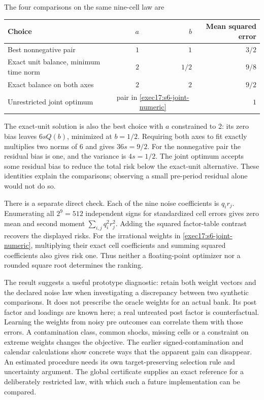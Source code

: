 The four comparisons on the same nine-cell law are
\begin{center}
\begin{tabular}{lrrr}
\toprule
Choice & $a$ & $b$ & Mean squared error\\
\midrule
Best nonnegative pair & $1$ & $1$ & $3/2$\\
Exact unit balance, minimum time norm & $2$ & $1/2$ & $9/8$\\
Exact balance on both axes & $2$ & $2$ & $9/2$\\
Unrestricted joint optimum & \multicolumn{2}{c}{pair in \eqref{exec17:s6-joint-numeric}} & $1$\\
\bottomrule
\end{tabular}
\end{center}
The exact-unit solution is also the best choice with $a$ constrained to 2:
its zero bias leaves $6sQ(b)$, minimized at $b=1/2$. Requiring both axes
to fit exactly multiplies two norms of 6 and gives $36s=9/2$. For the
nonnegative pair the residual bias is one, and the variance is $4s=1/2$.
The joint optimum accepts some residual bias to reduce the total risk below
the exact-unit alternative. These identities explain the comparisons;
observing a small pre-period residual alone would not do so.

There is a separate direct check. Each of the nine noise coefficients is
$q_i r_j$. Enumerating all $2^9=512$ independent signs for standardized
cell errors gives zero mean and second moment
$\sum_{i,j}q_i^2r_j^2$. Adding the squared factor-table contrast recovers
the displayed risks. For the irrational weights in
\eqref{exec17:s6-joint-numeric}, multiplying their exact cell coefficients
and summing squared coefficients also gives risk one. Thus neither a
floating-point optimizer nor a rounded square root determines the ranking.
\citep{exec17_s6_extension}

The result suggests a useful prototype diagnostic: retain both weight
vectors and the declared noise law when investigating a discrepancy between
two synthetic comparisons. It does not prescribe the oracle weights for an
actual bank. Its post factor and loadings are known here; a real untreated
post factor is counterfactual. Learning the weights from noisy pre outcomes
can correlate them with those errors. A contamination class, common shocks,
missing cells or a constraint on extreme weights changes the objective.
The earlier signed-contamination and calendar calculations show concrete
ways that the apparent gain can disappear. An estimated procedure needs its
own target-preserving selection rule and uncertainty argument. The global
certificate supplies an exact reference for a deliberately restricted law,
with which such a future implementation can be compared.

